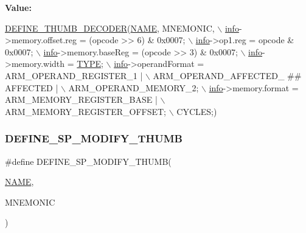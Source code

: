 {\bfseries Value\+:}
\begin{DoxyCode}
\mbox{\hyperlink{decoder-thumb_8c_a44d34ec3fd7c2c2ee51ff5966678c86e}{DEFINE\_THUMB\_DECODER}}(\mbox{\hyperlink{inflate_8h_a164ea0159d5f0b5f12a646f25f99eceaa67bc2ced260a8e43805d2480a785d312}{NAME}}, MNEMONIC, \(\backslash\)
        \mbox{\hyperlink{libretro_8h_structretro__game__info}{info}}->memory.offset.reg = (opcode >> 6) & 0x0007; \(\backslash\)
        \mbox{\hyperlink{libretro_8h_structretro__game__info}{info}}->op1.reg = opcode & 0x0007; \(\backslash\)
        \mbox{\hyperlink{libretro_8h_structretro__game__info}{info}}->memory.baseReg = (opcode >> 3) & 0x0007; \(\backslash\)
        \mbox{\hyperlink{libretro_8h_structretro__game__info}{info}}->memory.width = \mbox{\hyperlink{inflate9_8h_a164ea0159d5f0b5f12a646f25f99eceaab47ea8bb955afd0adc0ef98517dd6084}{TYPE}}; \(\backslash\)
        \mbox{\hyperlink{libretro_8h_structretro__game__info}{info}}->operandFormat = ARM\_OPERAND\_REGISTER\_1 | \(\backslash\)
            ARM\_OPERAND\_AFFECTED\_ ## AFFECTED | \(\backslash\)
            ARM\_OPERAND\_MEMORY\_2; \(\backslash\)
        \mbox{\hyperlink{libretro_8h_structretro__game__info}{info}}->memory.format = ARM\_MEMORY\_REGISTER\_BASE | \(\backslash\)
            ARM\_MEMORY\_REGISTER\_OFFSET; \(\backslash\)
        CYCLES;)
\end{DoxyCode}
\mbox{\label{decoder-thumb_8c_a2c95e7ce4f433fd8c88c4847461abd28}} 
\subsubsection{\texorpdfstring{D\+E\+F\+I\+N\+E\+\_\+\+S\+P\+\_\+\+M\+O\+D\+I\+F\+Y\+\_\+\+T\+H\+U\+MB}{DEFINE\_SP\_MODIFY\_THUMB}}
{\footnotesize\ttfamily \#define D\+E\+F\+I\+N\+E\+\_\+\+S\+P\+\_\+\+M\+O\+D\+I\+F\+Y\+\_\+\+T\+H\+U\+MB(\begin{DoxyParamCaption}\item[{}]{\mbox{\hyperlink{inflate_8h_a164ea0159d5f0b5f12a646f25f99eceaa67bc2ced260a8e43805d2480a785d312}{N\+A\+ME}},  }\item[{}]{M\+N\+E\+M\+O\+N\+IC }\end{DoxyParamCaption})}

